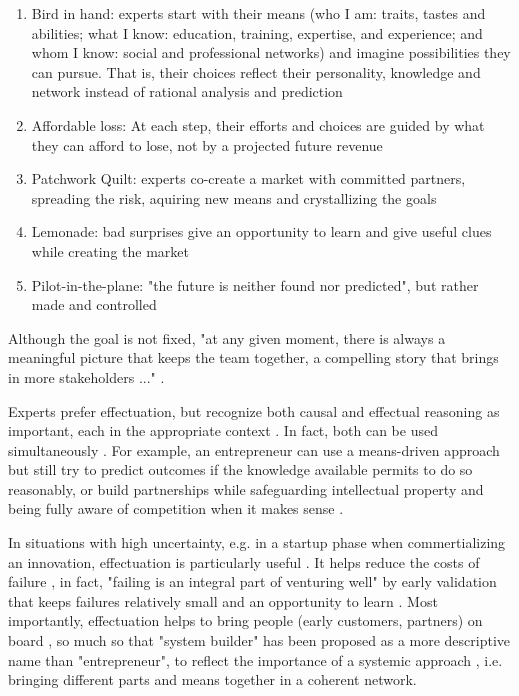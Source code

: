 \documentclass[a4paper,10pt]{book}
\begin{document}
\begin{enumerate}
 \item Bird in hand: experts start with their means (who I am: traits, tastes and abilities; 
  what I know: education, training, expertise, and experience; and whom I know: social and professional networks) \cite{effectuationWhatMakesEntrepreneurial} 
  and imagine possibilities they can pursue. 
    That is, their choices reflect their personality, knowledge and network instead of rational analysis and prediction
 \item Affordable loss: At each step, their efforts and choices are guided by what they can afford to lose, not by a projected future revenue
 \item Patchwork Quilt: experts co-create a market with committed partners, spreading the risk, aquiring new means and crystallizing the goals
 \item Lemonade: bad surprises give an opportunity to learn and give useful clues while creating the market
 \item Pilot-in-the-plane: "the future is neither found nor predicted", but rather made and controlled 
\end{enumerate}


Although the goal is not fixed, "at any given moment, there is always a meaningful picture that keeps the team together, a compelling story that brings in more
  stakeholders ..." \cite{effectuationWhatMakesEntrepreneurial}.
  
Experts prefer effectuation, but recognize both causal and effectual reasoning as important, each in the appropriate context \cite{effectuationProposal}\cite{effectuationBook}.
In fact, both can be used simultaneously \cite{effectuationVideoEffectuationVsCausation}\cite{effectuationCausationEffectuationAndPragmatism}. 
For example, an entrepreneur can use a 
means-driven approach but still try to predict outcomes if the knowledge available permits to do so reasonably, 
or build partnerships while safeguarding intellectual property and being fully aware of competition when it makes sense \cite{effectuationCausationEffectuationAndPragmatism}.

In situations with high uncertainty, e.g. in a startup phase when commertializing an innovation, effectuation is particularly useful \cite{effectuationProposal}.
It helps reduce the costs of failure \cite{effectuation101}, in fact, "failing is an integral part of venturing well" \cite{effectuationBook} 
by early validation that keeps failures relatively small and an opportunity to learn \cite{effectuationNewVenturePerformance}\cite{effectuationBook}. 
Most importantly, effectuation helps to bring people (early customers, partners) on board \cite{effectuationVideoEffectuationVsCausation}, 
so much so that "system builder" has been proposed as a more descriptive name than
"entrepreneur", to reflect the importance of a systemic approach \cite{effectuationSystemicDesign}, i.e. bringing different parts and means together in a coherent network.
\end{document}
